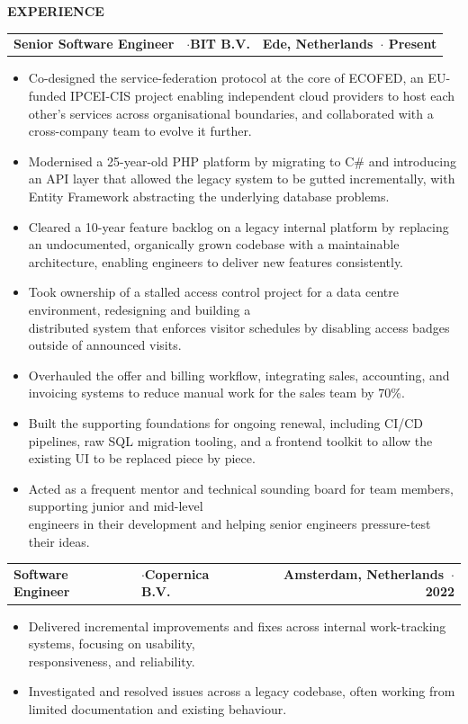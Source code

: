 \documentclass[10pt, a4paper]{article}
\newcommand{\headingbold}{\headingfont\bfseries}
\newcommand{\cvsection}[1]{%
  \vspace{4pt}
  \begin{tcolorbox}[
    colback=sectionblue!15,
    colframe=sectionblue!15,
    sharp corners,
    boxrule=0pt,
    left=0pt, right=0pt,
    top=2pt, bottom=2pt
  ]
  \centering\small\headingfont\bfseries\scshape\color{sectionblue}\MakeUppercase{#1}
  \end{tcolorbox}
  \vspace{4pt}
}
\newcommand{\role}[4]{%
  \noindent\color{black}
  \begin{tabularx}{\textwidth}{l X r}
    \headingbold#1 & $\cdot$\quad\headingbold\small#2 & 
    {\headingbold\small#3\ \quad$\cdot$\quad #4} \\
  \end{tabularx}
}
\begin{document}
\cvsection{Experience}

\role{Senior Software Engineer}{BIT B.V.}{Ede, Netherlands}{2023 \textendash\hspace{1pt} Present}
\begin{itemize}
  \color[gray]{0.3}
  \item Co-designed the service-federation protocol at the core of ECOFED, an EU-funded IPCEI-CIS project enabling independent cloud providers to host each other's services across organisational boundaries, and collaborated with a cross-company team to evolve it further.
  \item Modernised a 25-year-old PHP platform by migrating to C\# and introducing an API layer that allowed the legacy system to be gutted incrementally, with Entity Framework abstracting the underlying database problems.
  \item Cleared a 10-year feature backlog on a legacy internal platform by replacing an undocumented, organically grown codebase with a maintainable architecture, enabling engineers to deliver new features consistently.
  \item Took ownership of a stalled access control project for a data centre environment, redesigning and building a \\distributed system that enforces visitor schedules by disabling access badges outside of announced visits.
  \item Overhauled the offer and billing workflow, integrating sales, accounting, and invoicing systems to reduce manual work for the sales team by 70\%.
  \item Built the supporting foundations for ongoing renewal, including CI/CD pipelines, raw SQL migration tooling, and a frontend toolkit to allow the existing UI to be replaced piece by piece. 
  \item Acted as a frequent mentor and technical sounding board for team members, supporting junior and mid-level \\engineers in their development and helping senior engineers pressure-test their ideas.
\end{itemize}
\vspace{4pt}

\role{Software Engineer}{Copernica B.V.}{Amsterdam, Netherlands}{\hspace{0.95cm}2022}
\begin{itemize}
  \color[gray]{0.3}
  \item Delivered incremental improvements and fixes across internal work-tracking systems, focusing on usability, \\responsiveness, and reliability.
  \item Investigated and resolved issues across a legacy codebase, often working from limited documentation and existing behaviour.
\end{itemize}
\vspace{4pt}
\end{document}
